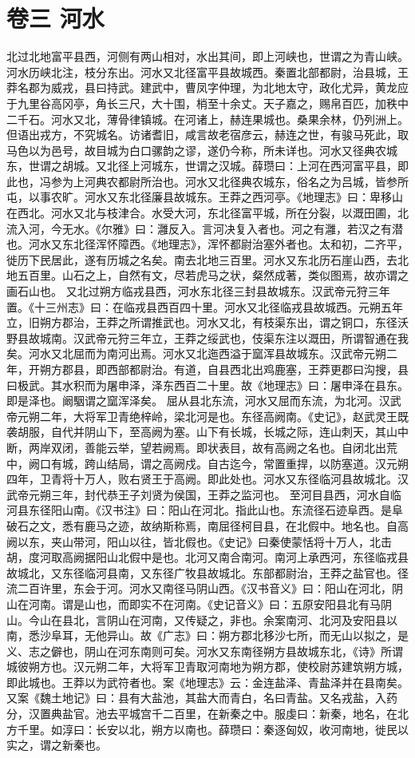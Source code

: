 \documentclass[12pt,UTF8]{ctexbook}
\begin{document}
\chapter{卷三 河水 }
北过北地富平县西，河侧有两山相对，水出其间，即上河峡也，世谓之为青山峡。河水历峡北注，枝分东出。河水又北径富平县故城西。秦置北部都尉，治县城，王莽名郡为威戎，县曰持武。建武中，曹凤字仲理，为北地太守，政化尤异，黄龙应于九里谷高冈亭，角长三尺，大十围，梢至十余丈。天子嘉之，赐帛百匹，加秩中二千石。河水又北，薄骨律镇城。在河诸上，赫连果城也。桑果余林，仍列洲上。但语出戎方，不究城名。访诸耆旧，咸言故老宿彦云，赫连之世，有骏马死此，取马色以为邑号，故目城为白口骡韵之谬，遂仍今称，所未详也。河水又径典农城东，世谓之胡城。又北径上河城东，世谓之汉城。薛瓒曰：上河在西河富平县，即此也，冯参为上河典农都尉所治也。河水又北径典农城东，俗名之为吕城，皆参所屯，以事农旷。河水又东北径廉县故城东。王莽之西河亭。《地理志》曰：卑移山在西北。河水又北与枝津合。水受大河，东北径富平城，所在分裂，以溉田圃，北流入河，今无水。《尔雅》曰：灉反入。言河决复入者也。河之有灉，若汉之有潜也。河水又东北径浑怀障西。《地理志》，浑怀都尉治塞外者也。太和初，二齐平，徙历下民居此，遂有历城之名矣。南去北地三百里。河水又东北历石崖山西，去北地五百里。山石之上，自然有文，尽若虎马之状，粲然成著，类似图焉，故亦谓之画石山也。
又北过朔方临戎县西，河水东北径三封县故城东。汉武帝元狩三年置。《十三州志》曰：在临戎县西百四十里。河水又北径临戎县故城西。元朔五年立，旧朔方郡治，王莽之所谓推武也。河水又北，有枝渠东出，谓之铜口，东径沃野县故城南。汉武帝元狩三年立，王莽之绥武也，伎渠东注以溉田，所谓智通在我矣。河水又北屈而为南河出焉。河水又北迤西溢于窳浑县故城东。汉武帝元朔二年，开朔方郡县，即西部都尉治。有道，自县西北出鸡鹿塞，王莽更郡曰沟搜，县曰极武。其水积而为屠申泽，泽东西百二十里。故《地理志》曰：屠申泽在县东。即是泽也。阚駰谓之窳浑泽矣。
屈从县北东流，河水又屈而东流，为北河。汉武帝元朔二年，大将军卫青绝梓岭，梁北河是也。东径高阙南。《史记》，赵武灵王既袭胡服，自代并阴山下，至高阙为塞。山下有长城，长城之际，连山刺天，其山中断，两岸双闭，善能云举，望若阙焉。即状表目，故有高阙之名也。自闭北出荒中，阙口有城，跨山结局，谓之高阙戍。自古迄今，常置重捍，以防塞道。汉元朔四年，卫青将十万人，败右贤王于高阙。即此处也。河水又东径临河县故城北。汉武帝元朔三年，封代恭王子刘贤为侯国，王莽之监河也。
至河目县西，河水自临河县东径阳山南。《汉书注》曰：阳山在河北。指此山也。东流径石迹阜西。是阜破石之文，悉有鹿马之迹，故纳斯称焉，南屈径柯目县，在北假中。地名也。自高阙以东，夹山带河，阳山以往，皆北假也。《史记》曰秦使蒙恬将十万人，北击胡，度河取高阙据阳山北假中是也。北河又南合南河。南河上承西河，东径临戎县故城北，又东径临河县南，又东径广牧县故城北。东部都尉治，王莽之盐官也。径流二百许里，东会于河。河水又南径马阴山西。《汉书音义》曰：阳山在河北，阴山在河南。谓是山也，而即实不在河南。《史记音义》曰：五原安阳县北有马阴山。今山在县北，言阴山在河南，又传疑之，非也。余案南河、北河及安阳县以南，悉沙阜耳，无他异山。故《广志》曰：朔方郡北移沙七所，而无山以拟之，是义、志之僻也，阴山在河东南则可矣。河水又东南径朔方县故城东北，《诗》所谓城彼朔方也。汉元朔二年，大将军卫青取河南地为朔方郡，使校尉苏建筑朔方城，即此城也。王莽以为武符者也。案《地理志》云：金连盐泽、青盐泽并在县南矣。又案《魏土地记》曰：县有大盐池，其盐大而青白，名曰青盐。又名戎盐，入药分，汉置典盐官。池去平城宫千二百里，在新秦之中。服虔曰：新秦，地名，在北方千里。如淳曰：长安以北，朔方以南也。薛瓒曰：秦逐匈奴，收河南地，徙民以实之，谓之新秦也。
\end{document}
